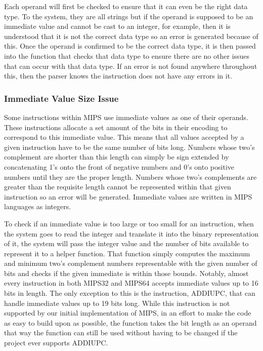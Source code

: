 \documentclass[parskip=half, fontsize=12pt]{scrartcl}
\begin{document}
Each operand will first be checked to ensure that it can even be the
right data type. To the system, they are all strings but if the operand
is supposed to be an immediate value and cannot be cast to an integer,
for example, then it is understood that it is not the correct data type
so an error is generated because of this. Once the operand is confirmed
to be the correct data type, it is then passed into the function that
checks that data type to ensure there are no other issues that can occur
with that data type. If an error is not found anywhere throughout this,
then the parser knows the instruction does not have any errors in it.

\subsubsection{Immediate Value Size Issue}

Some instructions within MIPS use immediate values as one of their
operands. These instructions allocate a set amount of the bits in their
encoding to correspond to this immediate value. This means that all
values accepted by a given instruction have to be the same number of
bits long. Numbers whose two's complement are shorter than this length
can simply be sign extended by concatenating 1's onto the front of
negative numbers and 0's onto positive numbers until they are the proper
length. Numbers whose two's complements are greater than the requisite
length cannot be represented within that given instruction so an error
will be generated. Immediate values are written in MIPS languages as
integers.

To check if an immediate value is too large or too small for an
instruction, when the system goes to read the integer and translate it
into the binary representation of it, the system will pass the integer
value and the number of bits available to represent it to a helper
function. That function simply computes the maximum and minimum two's
complement numbers representable with the given number of bits and
checks if the given immediate is within those bounds. Notably, almost
every instruction in both MIPS32 and MIPS64 accepts immediate values up
to 16 bits in length. The only exception to this is the instruction,
ADDIUPC, that can handle immediate values up to 19 bits long. While this
instruction is not supported by our initial implementation of MIPS, in
an effort to make the code as easy to build upon as possible, the
function takes the bit length as an operand that way the function can
still be used without having to be changed if the project ever supports
ADDIUPC.
\end{document}
